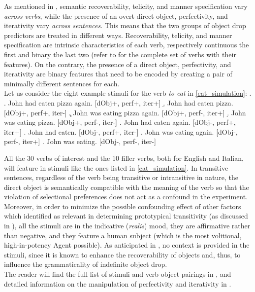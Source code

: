 As mentioned in , semantic recoverability, telicity, and manner specification vary \textit{across verbs}, while the presence of an overt direct object, perfectivity, and iterativity vary \textit{across sentences}. This means that the two groups of object drop predictors are treated in different ways. Recoverability, telicity, and manner specification are intrinsic characteristics of each verb, respectively continuous the first and binary the last two (refer to  for the complete set of verbs with their features). On the contrary, the presence of a direct object, perfectivity, and iterativity are binary features that need to be encoded by creating a pair of minimally different sentences for each.\\
Let us consider the eight example stimuli for the verb \textit{to eat} in \ref{eat_simulation}:
\ex. \label{eat_simulation} \a. John had eaten pizza again. \hfill {\small [dObj+, perf+, iter+]}
\b. John had eaten pizza. \hfill {\small [dObj+, perf+, iter-]}
\c. John was eating pizza again. \hfill {\small [dObj+, perf-, iter+]}
\d. John was eating pizza. \hfill {\small [dObj+, perf-, iter-]}
\e. John had eaten again. \hfill {\small [dObj-, perf+, iter+]}
\e. John had eaten. \hfill {\small [dObj-, perf+, iter-]}
\e. John was eating again. \hfill {\small [dObj-, perf-, iter+]}
\e. John was eating. \hfill {\small [dObj-, perf-, iter-]}

All the 30 verbs of interest and the 10 filler verbs, both for English and Italian, will feature in stimuli like the ones listed in \ref{eat_simulation}. In transitive sentences, regardless of the verb being transitive or intransitive in nature, the direct object is semantically compatible with the meaning of the verb so that the violation of selectional preferences does not act as a confound in the experiment. Moreover, in order to minimize the possible confounding effect of other factors which \textcite{HopperThompson1980} identified as relevant in determining prototypical transitivity (as discussed in ), all the stimuli are in the indicative (\textit{realis}) mood, they are affirmative rather than negative, and they feature a human subject (which is the most volitional, high-in-potency Agent possible). As anticipated in , no context is provided in the stimuli, since it is known to enhance the recoverability of objects and, thus, to influence the grammaticality of indefinite object drop.\\
The reader will find the full list of stimuli and verb-object pairings in , and detailed information on the manipulation of perfectivity and iterativity in .

